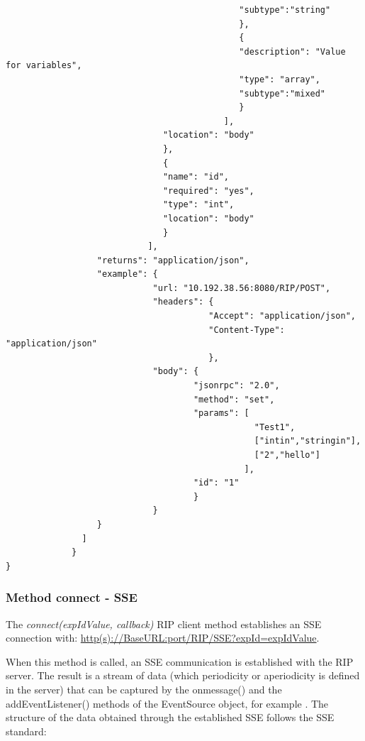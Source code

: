 \begin{lstlisting}
                                              "subtype":"string"
                                              },
                                              {
                                              "description": "Value for variables",
                                              "type": "array",
                                              "subtype":"mixed"
                                              }
                                           ],
                               "location": "body"
                               },
                               {
                               "name": "id",
                               "required": "yes",
                               "type": "int",
                               "location": "body"
                               }
                            ],
                  "returns": "application/json",
                  "example": {
                             "url: "10.192.38.56:8080/RIP/POST",
                             "headers": {
                                        "Accept": "application/json",
                                        "Content-Type": "application/json"
                                        },
                             "body": {
                                     "jsonrpc": "2.0",
                                     "method": "set",
                                     "params": [
                                                 "Test1",
                                                 ["intin","stringin"],
                                                 ["2","hello"]
                                               ],
                                     "id": "1"
                                     }
                             }
                  }
               ]
             }
}
\end{lstlisting}

\subsubsection{Method connect - SSE}
The \textit{connect(expIdValue, callback)} RIP client method establishes an SSE connection with: \url{http(s)://BaseURL:port/RIP/SSE?expId=expIdValue}.

When this method is called, an SSE communication is established with the RIP server. The result is a stream of data (which periodicity or aperiodicity is defined in the server) that can be captured by the onmessage() and the addEventListener() methods of the EventSource object, for example \cite{eventsource}. The structure of the data obtained through the established SSE follows the SSE standard:

